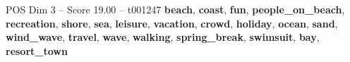 \begin{textsample}{POS Dim 3 – Score 19.00 – t001247}  \label{ex:f3_pos_015}
\textbf{beach}, \textbf{coast}, \textbf{fun}, \textbf{people\_on\_beach}, \textbf{recreation}, \textbf{shore}, \textbf{sea}, \textbf{leisure}, \textbf{vacation}, \textbf{crowd}, \textbf{holiday}, \textbf{ocean}, \textbf{sand}, \textbf{wind\_wave}, \textbf{travel}, \textbf{wave}, \textbf{walking}, \textbf{spring\_break}, \textbf{swimsuit}, \textbf{bay}, \textbf{resort\_town}

\end{textsample}
